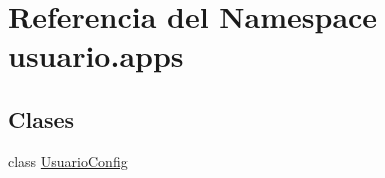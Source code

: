 \hypertarget{namespaceusuario_1_1apps}{}\section{Referencia del Namespace usuario.\+apps}
\label{namespaceusuario_1_1apps}
\subsection*{Clases}
\begin{DoxyCompactItemize}
\item 
class \hyperlink{classusuario_1_1apps_1_1_usuario_config}{Usuario\+Config}
\end{DoxyCompactItemize}
